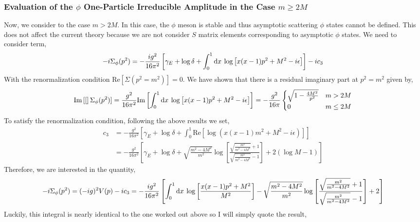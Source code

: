 \documentclass[12pt]{extarticle}
\begin{document}
\subsubsection{Evaluation of the $\phi$ One-Particle Irreducible Amplitude in the Case $m \ge 2 M$}

Now, we consider to the case $m > 2 M$. In this case, the $\phi$ meson is stable and thus asymptotic scattering $\phi$ states cannot be defined. This does not affect the current theory because we are not consider $S$ matrix elements corresponding to asymptotic $\phi$ states. We need to consider term,
\[ - i \Sigma_\phi(p^2) = - \frac{ig^2}{16 \pi^2}  \left[ \gamma_E + \log{\delta} + \int_{0}^{1} \mathrm{d}x \: \log{\left[ x(x-1)p^2 + M^2 - i \epsilon \right]} \right] - i c_3 \]
With the renormalization condition $\mathrm{Re}[\Sigma(p^2 = m^2)] = 0$. We have shown that there is a residual imaginary part at $p^2 = m^2$ given by,
\[\mathrm{Im}\left[ [ \right]\Sigma_\phi(p^2)] = \frac{g^2}{16 \pi^2} \mathrm{Im}\left[ \int_{0}^{1} \mathrm{d}x \: \log{\left[ x(x-1)p^2 + M^2 - i \epsilon \right]} \right] = -\frac{g^2}{16 \pi}
\begin{cases}
\sqrt{1 - \frac{4M^2}{p^2}} & m > 2M \\
0 & m \le 2M
\end{cases} \]
To satisfy the renormalization condition, following the above results we set,
\begin{align*}
c_3 & = - \frac{g^2}{16 \pi^2} \left[ \gamma_E + \log{\delta} + \int_0^1 \mathrm{Re}\left[ \log(x(x-1) m^2 + M^2 - i \epsilon) \right] \right] 
\\
&= - \frac{g^2}{16 \pi^2} \left[ \gamma_E + \log{\delta} + \sqrt{\frac{m^2 - 4 M^2}{m^2}} \log{\left[ \frac{\sqrt{\frac{m^2}{m^2 - 4 M^2}} + 1}{\sqrt{\frac{m^2}{m^2 - 4 M^2}} - 1} \right]} + 2( \log{M} - 1) \right]
\end{align*}
Therefore, we are interested in the quantity,
\[ - i \Sigma_\phi(p^2) = (-ig)^2 V(p) - i c_3 = - \frac{ig^2}{16 \pi^2} \left[ \int_{0}^{1} \mathrm{d}x \: \log{\left[\frac{x(x - 1) p^2 + M^2}{M^2} \right]} - \sqrt{\frac{m^2 - 4 M^2}{m^2}} \log{\left[ \frac{\sqrt{\frac{m^2}{m^2 - 4 M^2}} + 1}{\sqrt{\frac{m^2}{m^2 - 4 M^2}} - 1} \right]} + 2 \right] \]
Luckily, this integral is nearly identical to the one worked out above so I will simply quote the result,
\end{document}
